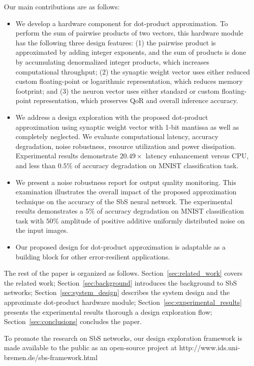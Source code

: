 Our main contributions are as follows:

\begin{itemize}
	\item We develop a hardware component for dot-product approximation. To perform the sum of pairwise products of two vectors, this hardware module has the following three design features: (1) the pairwise product is approximated by adding integer exponents, and the sum of products is done by accumulating denormalized integer products, which increases computational throughput; (2) the synaptic weight vector uses either reduced custom floating-point or logarithmic representation, which reduces memory footprint; and (3) the neuron vector uses either standard or custom floating-point representation, which preserves QoR and overall inference accuracy.
	\item We address a design exploration with the proposed dot-product approximation using synaptic weight vector with 1-bit mantissa as well as completely neglected. We evaluate computational latency, accuracy degradation, noise robustness, resource utilization and power dissipation. Experimental results demonstrate $20.49\times$ latency enhancement versus CPU, and less than $0.5\%$ of accuracy degradation on MNIST classification task.
	\item We present a noise robustness report for output quality monitoring. This examination illustrates the overall impact of the proposed approximation technique on the accuracy of the SbS neural network. The experimental results demonstrates a $5\%$ of accuracy degradation on MNIST classification task with $50\%$ amplitude of positive additive uniformly distributed noise on the input images.
	\item Our proposed design for dot-product approximation is adaptable as a building block for other error-resilient applications.
\end{itemize}


The rest of the paper is organized as follows. Section~\ref{sec:related_work} covers the related work; Section~\ref{sec:background} introduces the background to SbS networks; Section~\ref{sec:system_design} describes the system design and the approximate dot-product hardware module; Section~\ref{sec:experimental_results} presents the experimental results thorough a design exploration flow; Section~\ref{sec:conclusions} concludes the paper.


To promote the research on SbS networks, our design exploration framework is made available to the public as an open-source project at http://www.ids.uni-bremen.de/sbs-framework.html

